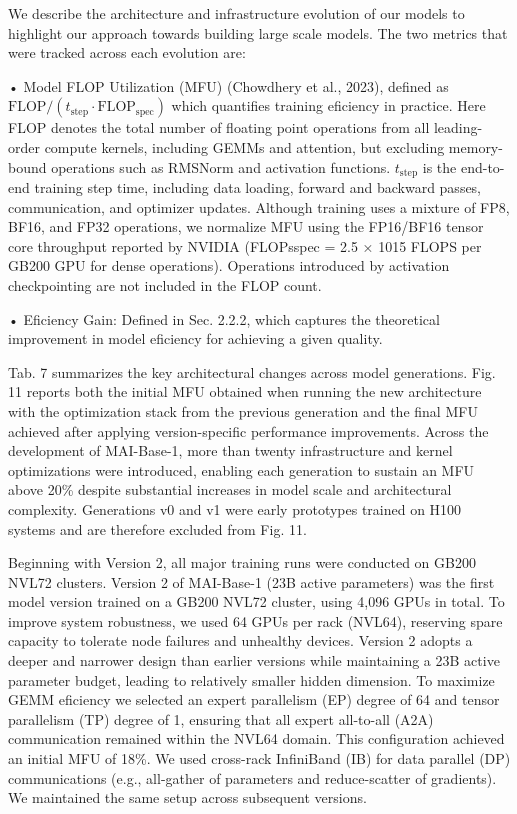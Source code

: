 \documentclass[
  10
]{article}
\begin{document}
We describe the architecture and infrastructure evolution of our models
to highlight our approach towards building large scale models. The two
metrics that were tracked across each evolution are:

• Model FLOP Utilization (MFU) (Chowdhery et al., 2023), defined as
\(\mathrm { F L O P } / ( t _ { \mathrm { s t e p } } { \cdot } \mathrm { F L O P } _ { \mathrm { s p e c } } )\)
which quantifies training eficiency in practice. Here FLOP denotes the
total number of floating point operations from all leading-order compute
kernels, including GEMMs and attention, but excluding memory-bound
operations such as RMSNorm and activation functions.
\(t _ { \mathrm { s t e p } }\) is the end-to-end training step time,
including data loading, forward and backward passes, communication, and
optimizer updates. Although training uses a mixture of FP8, BF16, and
FP32 operations, we normalize MFU using the FP16/BF16 tensor core
throughput reported by NVIDIA (FLOPsspec = 2.5 × 1015 FLOPS per GB200
GPU for dense operations). Operations introduced by activation
checkpointing are not included in the FLOP count.

• Eficiency Gain: Defined in Sec. 2.2.2, which captures the theoretical
improvement in model eficiency for achieving a given quality.

Tab. 7 summarizes the key architectural changes across model
generations. Fig. 11 reports both the initial MFU obtained when running
the new architecture with the optimization stack from the previous
generation and the final MFU achieved after applying version-specific
performance improvements. Across the development of MAI-Base-1, more
than twenty infrastructure and kernel optimizations were introduced,
enabling each generation to sustain an MFU above 20\% despite
substantial increases in model scale and architectural complexity.
Generations v0 and v1 were early prototypes trained on H100 systems and
are therefore excluded from Fig. 11.

Beginning with Version 2, all major training runs were conducted on
GB200 NVL72 clusters. Version 2 of MAI-Base-1 (23B active parameters)
was the first model version trained on a GB200 NVL72 cluster, using
4,096 GPUs in total. To improve system robustness, we used 64 GPUs per
rack (NVL64), reserving spare capacity to tolerate node failures and
unhealthy devices. Version 2 adopts a deeper and narrower design than
earlier versions while maintaining a 23B active parameter budget,
leading to relatively smaller hidden dimension. To maximize GEMM
eficiency we selected an expert parallelism (EP) degree of 64 and tensor
parallelism (TP) degree of 1, ensuring that all expert all-to-all (A2A)
communication remained within the NVL64 domain. This configuration
achieved an initial MFU of 18\%. We used cross-rack InfiniBand (IB) for
data parallel (DP) communications (e.g., all-gather of parameters and
reduce-scatter of gradients). We maintained the same setup across
subsequent versions.
\end{document}
